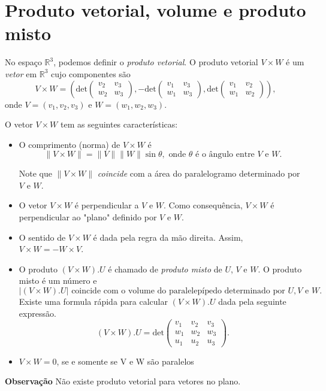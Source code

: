 \documentclass{article}
\theoremstyle{plain}
\theoremstyle{definition}
\theoremstyle{remark}
\begin{document}
\section{Produto vetorial, volume e produto misto}
  No espaço $\mathbb{R}^3$, podemos definir o {\it produto vetorial}. O produto vetorial  $V \times W$ é um {\it vetor} em $\mathbb{R}^{3}$ cujo componentes são 
$$V \times W =\left( \text{det}
                    \begin{pmatrix}
                    v_2 & v_3 \\
                    w_2 & w_3
                    \end{pmatrix}, 
                    -
                    \text{det}
                    \begin{pmatrix}
                    v_1 & v_3 \\
                    w_1 & w_3
                    \end{pmatrix},
                    \text{det} 
                    \begin{pmatrix}
                    v_1 & v_2 \\
                    w_1 & w_2
                    \end{pmatrix}
             \right), $$
onde $V=(v_1,v_2,v_3)$ e $W=(w_1, w_2, w_3)$.

O vetor $V \times W$ tem as seguintes características: 

\begin{itemize}
  \item O comprimento (norma) de $V \times W$ é 
  $$ \|V \times W\|=\|V\|\|W\| \sin \theta,
  \text{ onde } \theta \text{ é o ângulo entre } V \text{ e } W. $$
  
  Note que $\|V \times W\|$ {\it coincide} com a área do paralelogramo 
  determinado por $V$ e $W$.
 
  \item O vetor $V \times W$ é perpendicular a $V$ e $W$. 
  Como consequência, $V \times W$ é perpendicular ao "plano" 
  definido por $V$ e $W$.
  \item O sentido de $V \times W$ é dada pela regra da mão direita.
  Assim, $V \times W= - W \times V$.
  \item O produto $(V \times W). U$ é chamado de {\it produto misto} de $U$, $V$ e $W$.  O produto misto é um número 
  e $$|(V\times W). U| \text{ coincide com o volume do paralelepípedo determinado por } U, V \text{ e } W.$$
   Existe uma formula rápida para calcular $(V\times W). U$
   dada pela seguinte expressão.  
   $$(V\times W). U = \text{det}
                       \begin{pmatrix}
                       v_1 & v_2 & v_3 \\
                       w_1 & w_2 & w_3 \\
                       u_1 & u_2 & u_3 
                       \end{pmatrix}.$$
    \item $V \times W =0$, se e somente se V e W são paralelos                   
\end{itemize}
{\bf Observação} Não existe produto vetorial para vetores no plano.
 
\end{document}
